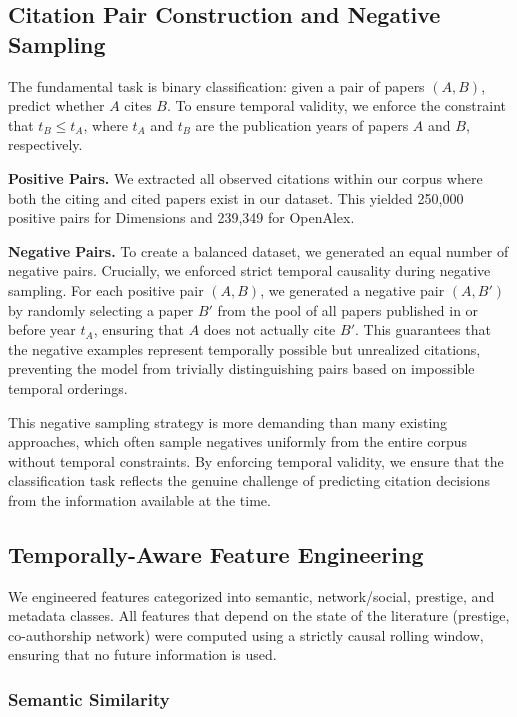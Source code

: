\documentclass[12pt,a4paper]{article}
\begin{document}
\subsection{Citation Pair Construction and Negative Sampling}

The fundamental task is binary classification: given a pair of papers $(A, B)$, predict whether $A$ cites $B$. To ensure temporal validity, we enforce the constraint that $t_B \le t_A$, where $t_A$ and $t_B$ are the publication years of papers $A$ and $B$, respectively.

\textbf{Positive Pairs.} We extracted all observed citations within our corpus where both the citing and cited papers exist in our dataset. This yielded 250,000 positive pairs for Dimensions and 239,349 for OpenAlex.

\textbf{Negative Pairs.} To create a balanced dataset, we generated an equal number of negative pairs. Crucially, we enforced strict temporal causality during negative sampling. For each positive pair $(A, B)$, we generated a negative pair $(A, B')$ by randomly selecting a paper $B'$ from the pool of all papers published in or before year $t_A$, ensuring that $A$ does not actually cite $B'$. This guarantees that the negative examples represent temporally possible but unrealized citations, preventing the model from trivially distinguishing pairs based on impossible temporal orderings.

This negative sampling strategy is more demanding than many existing approaches, which often sample negatives uniformly from the entire corpus without temporal constraints. By enforcing temporal validity, we ensure that the classification task reflects the genuine challenge of predicting citation decisions from the information available at the time.

\subsection{Temporally-Aware Feature Engineering}

We engineered features categorized into semantic, network/social, prestige, and metadata classes. All features that depend on the state of the literature (prestige, co-authorship network) were computed using a strictly causal rolling window, ensuring that no future information is used.

\subsubsection{Semantic Similarity}
\end{document}
